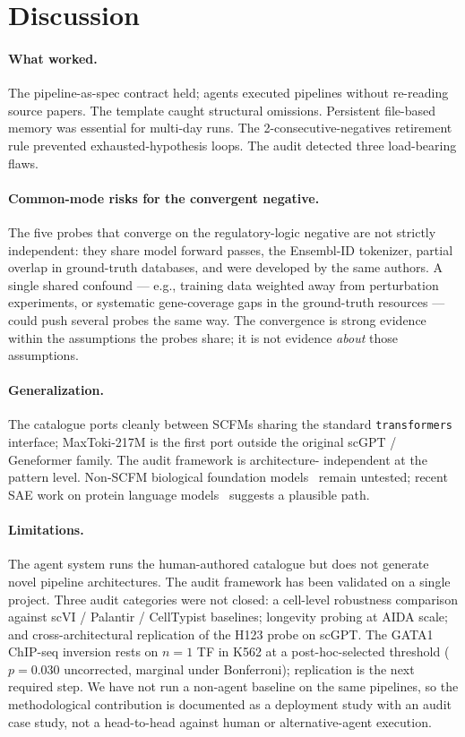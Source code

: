 \documentclass{article}
\newcommand{\maxtoki}{MaxToki-217M\xspace}
\newcommand{\scfm}{SCFM\xspace}
\begin{document}
\section{Discussion}
\label{sec:discussion}

\paragraph{What worked.} The pipeline-as-spec contract held;
agents executed pipelines without re-reading source papers. The
template caught structural omissions. Persistent file-based memory
was essential for multi-day runs. The 2-consecutive-negatives
retirement rule prevented exhausted-hypothesis loops. The audit
detected three load-bearing flaws.

\paragraph{Common-mode risks for the convergent negative.} The
five probes that converge on the regulatory-logic negative are not
strictly independent: they share model forward passes, the
Ensembl-ID tokenizer, partial overlap in ground-truth databases,
and were developed by the same authors. A single shared confound
--- e.g., training data weighted away from perturbation
experiments, or systematic gene-coverage gaps in the ground-truth
resources --- could push several probes the same way. The
convergence is strong evidence within the assumptions the probes
share; it is not evidence \emph{about} those assumptions.

\paragraph{Generalization.} The catalogue ports cleanly between
\scfm{}s sharing the standard \texttt{transformers}
interface; \maxtoki{} is the first port outside the original scGPT
/ Geneformer family. The audit framework is architecture-
independent at the pattern level. Non-\scfm{} biological
foundation models~\citep{lin2023esm2,jumper2021alphafold,nguyen2024evo,dallatorre2024nucleotide}
remain untested; recent SAE work on protein language
models~\citep{simon2025interplm} suggests a plausible path.

\paragraph{Limitations.} The agent system runs the human-authored
catalogue but does not generate novel pipeline architectures. The
audit framework has been validated on a single project. Three
audit categories were not closed: a cell-level robustness
comparison against scVI / Palantir / CellTypist baselines;
longevity probing at AIDA scale; and cross-architectural
replication of the H123 probe on scGPT. The GATA1 ChIP-seq
inversion rests on $n{=}1$ TF in K562 at a post-hoc-selected
threshold ($p{=}0.030$ uncorrected, marginal under Bonferroni);
replication is the next required step. We have not run a
non-agent baseline on the same pipelines, so the methodological
contribution is documented as a deployment study with an audit
case study, not a head-to-head against human or alternative-agent
execution.
\end{document}
